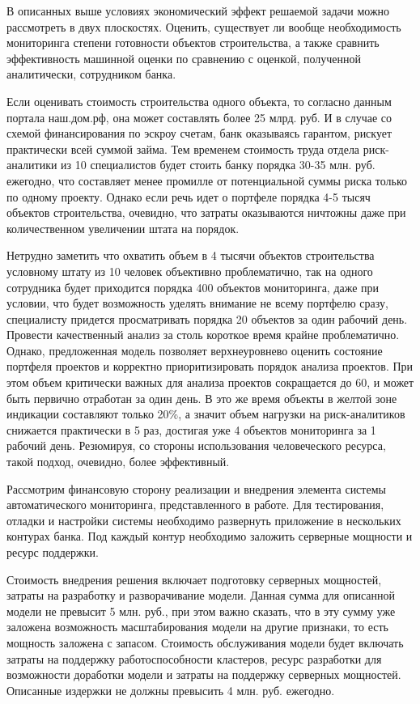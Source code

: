 \documentclass[12pt,a4paper]{article} %
\begin{document}
В описанных выше условиях экономический эффект решаемой задачи можно рассмотреть в двух плоскостях. Оценить, существует ли вообще необходимость мониторинга степени готовности объектов строительства, а также сравнить эффективность  машинной оценки по сравнению с оценкой, полученной аналитически, сотрудником банка.

Если оценивать стоимость строительства одного объекта, то согласно данным портала наш.дом.рф\cite{domrf}, она может составлять более 25 млрд. руб. И в случае со схемой финансирования по эскроу счетам, банк оказываясь гарантом, рискует практически всей суммой займа. Тем временем стоимость труда отдела риск-аналитики из 10 специалистов будет стоить банку порядка 30-35 млн. руб. ежегодно, что составляет менее промилле от потенциальной суммы риска только по одному проекту. Однако если речь идет о портфеле порядка 4-5 тысяч объектов строительства, очевидно, что затраты оказываются ничтожны даже при количественном увеличении штата на порядок. 

Нетрудно заметить что охватить объем в 4 тысячи объектов строительства условному штату из 10 человек объективно проблематично, так на одного сотрудника будет приходится порядка 400 объектов мониторинга, даже при условии, что будет возможность уделять внимание не всему портфелю сразу, специалисту придется просматривать порядка 20 объектов за один рабочий день. Провести качественный анализ за столь короткое время крайне проблематично. Однако, предложенная модель позволяет верхнеуровнево оценить состояние портфеля проектов и корректно приоритизировать порядок анализа проектов. При этом объем критически важных для анализа проектов сокращается до 60, и может быть первично отработан за один день. В это же время объекты в желтой зоне индикации составляют только 20\%, а значит объем нагрузки на риск-аналитиков снижается практически в 5 раз, достигая уже 4 объектов мониторинга за 1 рабочий день. Резюмируя, со стороны использования человеческого ресурса, такой подход, очевидно, более эффективный.

Рассмотрим финансовую сторону реализации и внедрения элемента системы автоматического мониторинга, представленного в работе. Для тестирования, отладки и настройки системы необходимо развернуть приложение в нескольких контурах банка. Под каждый контур необходимо заложить серверные мощности и ресурс поддержки. 

Стоимость внедрения решения включает подготовку серверных мощностей, затраты на разработку и разворачивание модели. Данная сумма для описанной модели не превысит 5 млн. руб., при этом важно сказать, что в эту сумму уже заложена возможность масштабирования модели на другие признаки, то есть мощность заложена с запасом. Стоимость обслуживания модели будет включать затраты на поддержку работоспособности кластеров, ресурс разработки для возможности доработки модели и затраты на поддержку серверных мощностей. Описанные издержки не должны превысить 4 млн. руб. ежегодно. 
\end{document}
